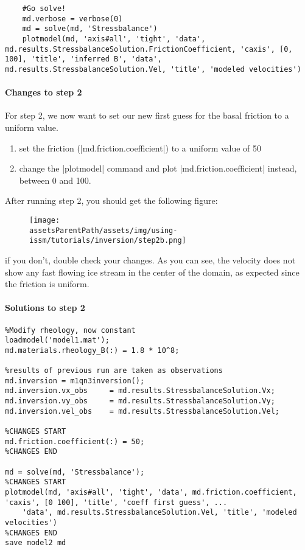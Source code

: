 \begin{lstlisting}
    #Go solve!
    md.verbose = verbose(0)
    md = solve(md, 'Stressbalance')
    plotmodel(md, 'axis#all', 'tight', 'data', md.results.StressbalanceSolution.FrictionCoefficient, 'caxis', [0, 100], 'title', 'inferred B', 'data', md.results.StressbalanceSolution.Vel, 'title', 'modeled velocities')
\end{lstlisting}

\paragraph{Changes to step 2}
For step 2, we now want to set our new first guess for the basal friction to a uniform value.
\begin{enumerate}
	\item set the friction (\lstinlinebg|md.friction.coefficient|) to a uniform value of 50
	\item change the \lstinlinebg|plotmodel| command and plot \lstinlinebg|md.friction.coefficient| instead, between 0 and 100.
\end{enumerate}
After running step 2, you should get the following figure:
\begin{figure}[H]
	\begin{center}
		\texttt{[image: \\assetsParentPath/assets/img/using-issm/tutorials/inversion/step2b.png]}
	\end{center}
\end{figure}
if you don't, double check your changes. As you can see, the velocity does not show any fast flowing ice stream in the center of the domain, as expected since the friction is uniform.

\paragraph{Solutions to step 2}
\begin{lstlisting}
%Modify rheology, now constant
loadmodel('model1.mat');
md.materials.rheology_B(:) = 1.8 * 10^8;

%results of previous run are taken as observations
md.inversion = m1qn3inversion();
md.inversion.vx_obs		= md.results.StressbalanceSolution.Vx;
md.inversion.vy_obs		= md.results.StressbalanceSolution.Vy;
md.inversion.vel_obs	= md.results.StressbalanceSolution.Vel;

%CHANGES START
md.friction.coefficient(:) = 50;
%CHANGES END

md = solve(md, 'Stressbalance');
%CHANGES START
plotmodel(md, 'axis#all', 'tight', 'data', md.friction.coefficient, 'caxis', [0 100], 'title', 'coeff first guess', ...
	'data', md.results.StressbalanceSolution.Vel, 'title', 'modeled velocities')
%CHANGES END
save model2 md
\end{lstlisting}

